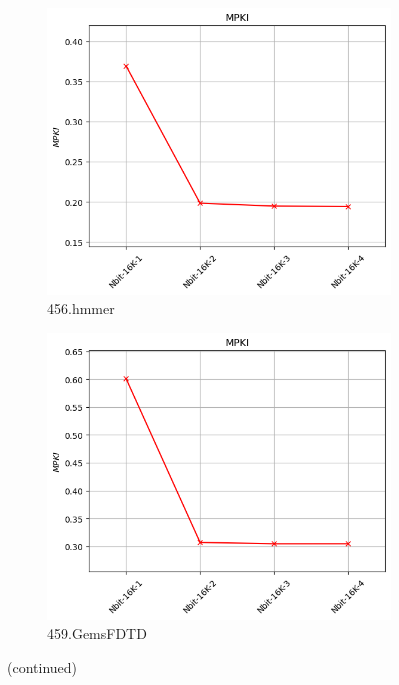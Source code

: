 \documentclass{article}
\begin{document}
\begin{figure}[H]
    \vspace{0.5cm} %

    \begin{subfigure}[b]{0.45\textwidth}
        \includegraphics[width=\textwidth]{figures/5_3/456.hmmer.cslab_branch_preds_ref.out.png}
        \caption{456.hmmer}
        \label{fig:plot11}
    \end{subfigure}
    \hfill
    \begin{subfigure}[b]{0.45\textwidth}
        \includegraphics[width=\textwidth]{figures/5_3/459.GemsFDTD.cslab_branch_preds_ref.out.png}
        \caption{459.GemsFDTD}
        \label{fig:plot12}
    \end{subfigure}
    \vspace{0.5cm} 

    \caption{(continued)}
    \label{fig:nbits_part2}
\end{figure}
\end{document}

